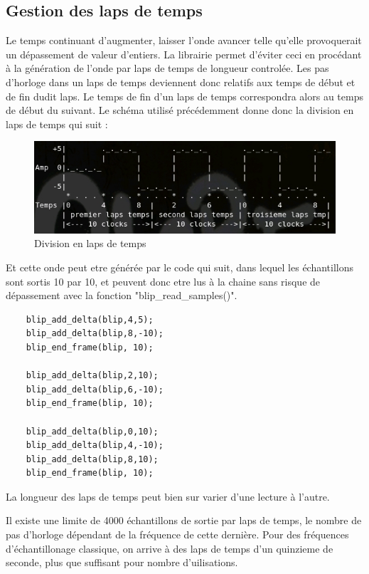 \documentclass{report}
\begin{document}
\subsection{Gestion des laps de temps}
Le temps continuant d'augmenter, laisser l'onde avancer telle qu'elle provoquerait un dépassement de valeur d'entiers. 
La librairie permet d'éviter ceci en procédant à la génération de l'onde par laps de temps de longueur controlée.
Les pas d'horloge dans un laps de temps deviennent donc relatifs aux temps de début et de fin dudit laps.
Le temps de fin d'un laps de temps correspondra alors au temps de début du suivant.
Le schéma utilisé précédemment donne donc la division en laps de temps qui suit :

\begin{figure}[h]
\centering
\includegraphics[scale=0.5]{images/Wave3.jpg}
\caption{Division en laps de temps}
\label{WAV3}
\end{figure}

Et cette onde peut etre générée par le code qui suit, dans lequel les échantillons sont sortis 10 par 10, et peuvent donc etre lus à la chaine sans risque de dépassement avec la fonction "blip\_read\_samples()".

\begin{lstlisting}
	blip_add_delta(blip,4,5);
	blip_add_delta(blip,8,-10);
	blip_end_frame(blip, 10);
	
	blip_add_delta(blip,2,10);
	blip_add_delta(blip,6,-10);
	blip_end_frame(blip, 10);
	
	blip_add_delta(blip,0,10);
	blip_add_delta(blip,4,-10);
	blip_add_delta(blip,8,10);
	blip_end_frame(blip, 10);
\end{lstlisting}

La longueur des laps de temps peut bien sur varier d'une lecture à l'autre.

Il existe une limite de 4000 échantillons de sortie par laps de temps, le nombre de pas d'horloge dépendant de la fréquence de cette dernière.
Pour des fréquences d'échantillonage classique, on arrive à des laps de temps d'un quinzieme de seconde, plus que suffisant pour nombre d'uilisations.
\end{document}
